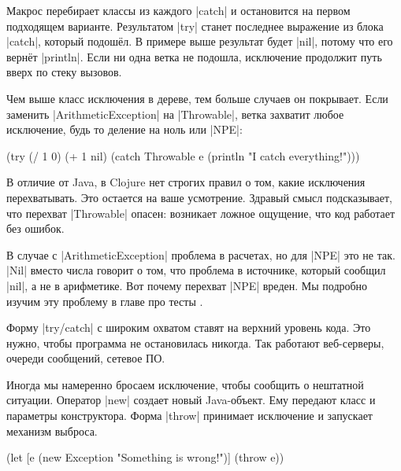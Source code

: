 Макрос перебирает классы из каждого \spverb|catch| и остановится на первом
подходящем варианте. Результатом \spverb|try| станет последнее выражение из
блока \spverb|catch|, который подош\"{е}л. В примере выше результат будет
\spverb|nil|, потому что его верн\"{е}т \spverb|println|. Если ни одна ветка не
подошла, исключение продолжит путь вверх по стеку вызовов.


Чем выше класс исключения в дереве, тем больше случаев он покрывает. Если
заменить \spverb|ArithmeticException| на \spverb|Throwable|, ветка захватит
любое исключение, будь то деление на ноль или \spverb|NPE|:

\begin{english}
  \begin{clojure}
(try
  (/ 1 0)
  (+ 1 nil)
  (catch Throwable e
    (println "I catch everything!")))
  \end{clojure}
\end{english}

В отличие от Java, в Clojure нет строгих правил о том, какие исключения
перехватывать. Это остается на ваше усмотрение. Здравый смысл подсказывает, что
перехват \spverb|Throwable| опасен: возникает ложное ощущение, что код работает
без ошибок.

В случае с \spverb|ArithmeticException| проблема в расчетах, но для \spverb|NPE|
это не так. \spverb|Nil| вместо числа говорит о том, что проблема в источнике,
который сообщил \spverb|nil|, а не в арифметике. Вот почему перехват
\spverb|NPE| вреден. Мы подробно изучим эту проблему в главе про
тесты .

Форму \spverb|try/catch| с широким охватом ставят на верхний уровень кода. Это
нужно, чтобы программа не остановилась никогда. Так работают веб-серверы,
очереди сообщений, сетевое ПО.


Иногда мы намеренно бросаем исключение, чтобы сообщить о нештатной
ситуации. Оператор \spverb|new| создает новый Java-объект. Ему передают класс и
параметры конструктора. Форма \spverb|throw| принимает исключение и запускает
механизм выброса.

\begin{english}
  \begin{clojure}
(let [e (new Exception "Something is wrong!")]
  (throw e))
  \end{clojure}
\end{english}

